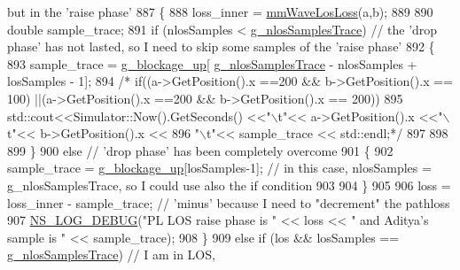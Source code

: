 \begin{DoxyCode}
{       but in the 'raise phase'}
887                         \{
888                                 loss\_inner = \hyperlink{classns3_1_1BuildingsObstaclePropagationLossModel_ad689fe28aa4e050953598741fa1a627c}{mmWaveLosLoss}(a,b);
889 
890                                 \textcolor{keywordtype}{double} sample\_trace;
891                                 \textcolor{keywordflow}{if} (nlosSamples < \hyperlink{namespacens3_aa27c343924716ad4dac244babcba8297}{g\_nlosSamplesTrace}) \textcolor{comment}{// the 'drop phase'
       has not lasted, so I need to skip some samples of the 'raise phase'}
892                                 \{
893                                          sample\_trace = \hyperlink{namespacens3_a57d17b28db9a8a2ad97697cff5e5c76e}{g\_blockage\_up}[
      \hyperlink{namespacens3_aa27c343924716ad4dac244babcba8297}{g\_nlosSamplesTrace} - nlosSamples + losSamples - 1];
894                                 \textcolor{comment}{/*       if((a->GetPosition().x ==200 && b->GetPosition().x == 100)
       ||(a->GetPosition().x ==200 && b->GetPosition().x == 200))}
895 \textcolor{comment}{                                                 std::cout<<Simulator::Now().GetSeconds() <<"\(\backslash\)t"<< 
       a->GetPosition().x <<"\(\backslash\)t"<< b->GetPosition().x <<}
896 \textcolor{comment}{                                                 "\(\backslash\)t"<< sample\_trace << std::endl;*/}
897 
898 
899                                 \}
900                                 \textcolor{keywordflow}{else} \textcolor{comment}{// 'drop phase' has been completely overcome}
901                                 \{
902                                          sample\_trace = \hyperlink{namespacens3_a57d17b28db9a8a2ad97697cff5e5c76e}{g\_blockage\_up}[losSamples-1]; \textcolor{comment}{// in
       this case, nlosSamples = g\_nlosSamplesTrace, so I could use also the if condition}
903 
904                                 \}
905                                 
906                                 loss = loss\_inner - sample\_trace; \textcolor{comment}{// 'minus' because I need to "decrement"
       the pathloss}
907                                 \hyperlink{group__logging_ga413f1886406d49f59a6a0a89b77b4d0a}{NS\_LOG\_DEBUG}(\textcolor{stringliteral}{"PL LOS raise phase is "} << loss << \textcolor{stringliteral}{" and Aditya's
       sample is "} << sample\_trace);   
908                         \}
909                         \textcolor{keywordflow}{else} \textcolor{keywordflow}{if} (los && losSamples == \hyperlink{namespacens3_aa27c343924716ad4dac244babcba8297}{g\_nlosSamplesTrace}) \textcolor{comment}{// I am in LOS,
}
\end{DoxyCode}
